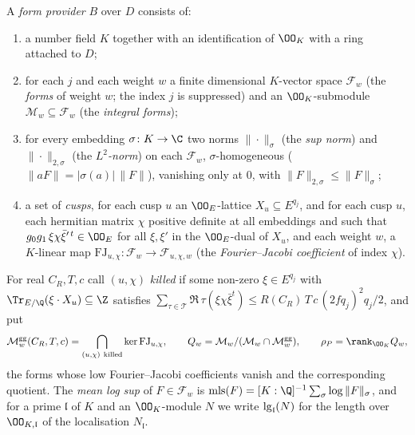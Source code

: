 \begin{definition}\label{pf:onto1:prov}
A \emph{form provider} $B$ over $D$ consists of:
\begin{enumerate}[label=(\roman*)]
\item a number field $K$ together with an identification of $\OO_K$ with a ring attached to $D$;
\item for each $j$ and each weight $w$ a finite dimensional $K$-vector space $\mathcal F_w$ (the \emph{forms}
of weight $w$; the index $j$ is suppressed) and an $\OO_K$-submodule $\mathcal M_w\subseteq\mathcal F_w$ (the
\emph{integral forms});
\item for every embedding $\sigma\colon K\to\C$ two norms $\|\cdot\|_\sigma$ (the \emph{sup norm}) and
$\|\cdot\|_{2,\sigma}$ (the \emph{$L^2$-norm}) on each $\mathcal F_w$, $\sigma$-homogeneous
($\|aF\|=|\sigma(a)|\,\|F\|$), vanishing only at $0$, with $\|F\|_{2,\sigma}\le\|F\|_\sigma$;
\item a set of \emph{cusps}, for each cusp $u$ an $\OO_E$-lattice $X_u\subseteq E^{q_j}$, and for each cusp $u$,
each hermitian matrix $\chi$ positive definite at all embeddings and such that $g_0g_1\,\xi\chi\bar\xi'^{\,t}\in\OO_E$
for all $\xi,\xi'$ in the $\OO_E$-dual of $X_u$, and each weight $w$, a $K$-linear map
$\mathrm{FJ}_{u,\chi}\colon\mathcal F_w\to\mathcal F_{u,\chi,w}$ (the \emph{Fourier--Jacobi coefficient} of index $\chi$).
\end{enumerate}
For real $C_R,T,c$ call $(u,\chi)$ \emph{killed} if some non-zero $\xi\in E^{q_j}$ with
$\Tr_{E/\Q}(\xi\cdot X_u)\subseteq\Z$ satisfies $\sum_{\tau\in\mathcal T}\Re\,\tau(\xi\chi\bar\xi^{t})\le
R(C_R)\,T\,c\,(2fq_j)^2q_j/2$, and put
\[
\mathcal M^{\mathrm{gg}}_w(C_R,T,c)=\bigcap_{(u,\chi)\ \text{killed}}\ker\mathrm{FJ}_{u,\chi},
\qquad Q_w=\mathcal M_w/(\mathcal M_w\cap\mathcal M^{\mathrm{gg}}_w),\qquad \rho_P=\rank_{\OO_K}Q_w ,
\]
the forms whose low Fourier--Jacobi coefficients vanish and the corresponding quotient. The \emph{mean log sup}
of $F\in\mathcal F_w$ is $\ontoonemls(F)=[K:\Q]^{-1}\sum_\sigma\log\|F\|_\sigma$, and for a prime $\mathfrak l$ of $K$ and an
$\OO_K$-module $N$ we write $\operatorname{lg}_{\mathfrak l}(N)$ for the length over $\OO_{K,\mathfrak l}$ of the localisation
$N_{\mathfrak l}$.
\end{definition}

